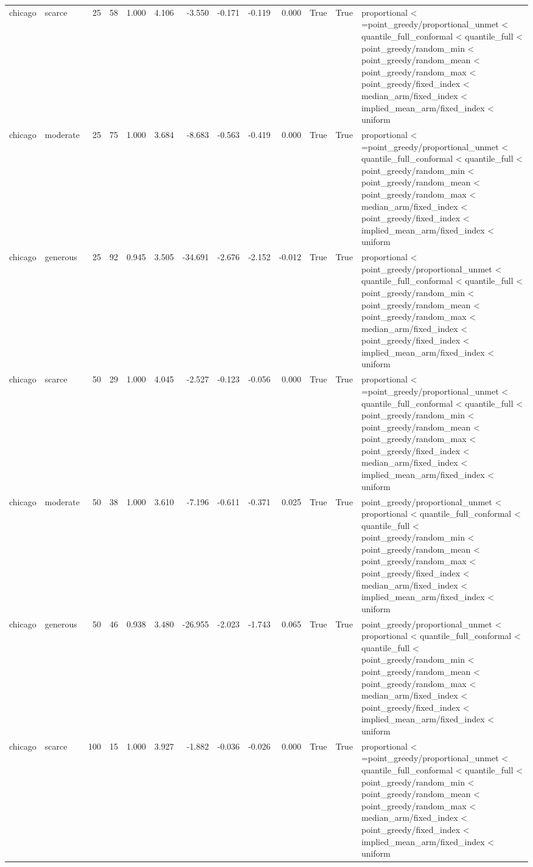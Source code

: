 \begin{tabular}{llrrrrrrrrrrl}
chicago & scarce & 25 & 58 & 1.000 & 4.106 & -3.550 & -0.171 & -0.119 & 0.000 & True & True & proportional < =point\_greedy/proportional\_unmet < quantile\_full\_conformal < quantile\_full < point\_greedy/random\_min < point\_greedy/random\_mean < point\_greedy/random\_max < point\_greedy/fixed\_index < median\_arm/fixed\_index < implied\_mean\_arm/fixed\_index < uniform \\
chicago & moderate & 25 & 75 & 1.000 & 3.684 & -8.683 & -0.563 & -0.419 & 0.000 & True & True & proportional < =point\_greedy/proportional\_unmet < quantile\_full\_conformal < quantile\_full < point\_greedy/random\_min < point\_greedy/random\_mean < point\_greedy/random\_max < median\_arm/fixed\_index < point\_greedy/fixed\_index < implied\_mean\_arm/fixed\_index < uniform \\
chicago & generous & 25 & 92 & 0.945 & 3.505 & -34.691 & -2.676 & -2.152 & -0.012 & True & True & proportional < point\_greedy/proportional\_unmet < quantile\_full\_conformal < quantile\_full < point\_greedy/random\_min < point\_greedy/random\_mean < point\_greedy/random\_max < median\_arm/fixed\_index < point\_greedy/fixed\_index < implied\_mean\_arm/fixed\_index < uniform \\
chicago & scarce & 50 & 29 & 1.000 & 4.045 & -2.527 & -0.123 & -0.056 & 0.000 & True & True & proportional < =point\_greedy/proportional\_unmet < quantile\_full\_conformal < quantile\_full < point\_greedy/random\_min < point\_greedy/random\_mean < point\_greedy/random\_max < point\_greedy/fixed\_index < median\_arm/fixed\_index < implied\_mean\_arm/fixed\_index < uniform \\
chicago & moderate & 50 & 38 & 1.000 & 3.610 & -7.196 & -0.611 & -0.371 & 0.025 & True & True & point\_greedy/proportional\_unmet < proportional < quantile\_full\_conformal < quantile\_full < point\_greedy/random\_min < point\_greedy/random\_mean < point\_greedy/random\_max < point\_greedy/fixed\_index < median\_arm/fixed\_index < implied\_mean\_arm/fixed\_index < uniform \\
chicago & generous & 50 & 46 & 0.938 & 3.480 & -26.955 & -2.023 & -1.743 & 0.065 & True & True & point\_greedy/proportional\_unmet < proportional < quantile\_full\_conformal < quantile\_full < point\_greedy/random\_min < point\_greedy/random\_mean < point\_greedy/random\_max < median\_arm/fixed\_index < point\_greedy/fixed\_index < implied\_mean\_arm/fixed\_index < uniform \\
chicago & scarce & 100 & 15 & 1.000 & 3.927 & -1.882 & -0.036 & -0.026 & 0.000 & True & True & proportional < =point\_greedy/proportional\_unmet < quantile\_full\_conformal < quantile\_full < point\_greedy/random\_min < point\_greedy/random\_mean < point\_greedy/random\_max < median\_arm/fixed\_index < point\_greedy/fixed\_index < implied\_mean\_arm/fixed\_index < uniform \\

\end{tabular}
